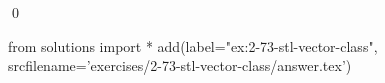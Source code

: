 
\begin{ex}
  \label{ex:2-73-stl-vector-class}
  
  \qed
\end{ex}
\begin{python0}
from solutions import *
add(label="ex:2-73-stl-vector-class",
    srcfilename='exercises/2-73-stl-vector-class/answer.tex')
\end{python0}
